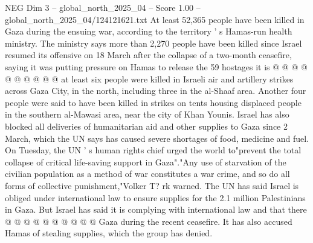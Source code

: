 \begin{textsample}{NEG Dim 3 – global\_north\_2025\_04 – Score 1.00 – global\_north\_2025\_04/124121621.txt}
At least 52,365 people have been killed in Gaza during the ensuing war, according to the territory ' s Hamas-run health ministry.
The ministry says more than 2,270 people have been killed since Israel resumed its offensive on 18 March after the collapse of a two-month ceasefire, saying it was putting pressure on Hamas to release the 59 hostages it is @ @ @ @ @ @ @ @ @ @ at least six people were killed in Israeli air and artillery strikes across Gaza City, in the north, including three in the al-Shaaf area.
Another four people were said to have been killed in strikes on tents housing displaced people in the southern al-Mawasi area, near the city of Khan Younis.
Israel has also blocked all deliveries of humanitarian aid and other supplies to Gaza since 2 March, which the UN says has caused severe shortages of food, medicine and fuel.
On Tuesday, the UN ' s human rights chief urged the world to"prevent the total collapse of critical life-saving support in Gaza"."Any use of starvation of the civilian population as a method of war constitutes a war crime, and so do all forms of collective punishment,"Volker T? rk warned.
The UN has said Israel is obliged under international law to ensure supplies for the 2.1 million Palestinians in Gaza.
But Israel has said it is complying with international law and that there @ @ @ @ @ @ @ @ @ @ Gaza during the recent ceasefire.
It has also accused Hamas of stealing supplies, which the group has denied.

\end{textsample}
